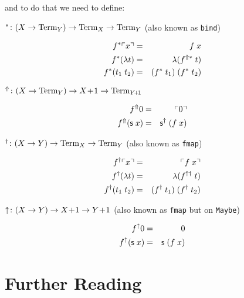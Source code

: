 and to do that we need to define:

$^* \colon (X \to \mathrm{Term}_{Y}) \to \mathrm{Term}_{X} \to \mathrm{Term}_{Y}$ (also known as \texttt{bind})

\begin{eqnarray*}
  f^*\ulcorner x \urcorner   & = & f\;x \\
  f^*(\lambda t) & = & \lambda (f^{\Uparrow*} \; t) \\
  f^*(t_1\;t_2)  & = & (f^* \; t_1) \; (f^* \; t_2)
\end{eqnarray*}

$^\Uparrow \colon (X \to \mathrm{Term}_{Y}) \to X\!+\!1 \to \mathrm{Term}_{Y\!+\!1}$

\begin{eqnarray*}
  f^\Uparrow 0 & = & \ulcorner 0 \urcorner \\
  f^\Uparrow (\mathsf{s} \; x) & = & \mathsf{s}^\dagger\;(f\;x) \\
\end{eqnarray*}

$^\dagger \colon (X \to Y) \to \mathrm{Term}_{X} \to \mathrm{Term}_{Y}$ (also known as \texttt{fmap})

\begin{eqnarray*}
  f^\dagger\ulcorner x \urcorner   & = & \ulcorner f\;x \urcorner \\
  f^\dagger(\lambda t) & = & \lambda(f^{\uparrow\dagger}\;t) \\
  f^\dagger(t_1\;t_2)  & = & (f^\dagger\;t_1)\;(f^\dagger\;t_2)
\end{eqnarray*}

$\uparrow \colon (X \to Y) \to X\!+\!1 \to Y\!+\!1$
  (also known as \texttt{fmap} but on \texttt{Maybe})

\begin{eqnarray*}
  f^\uparrow 0            & = & 0 \\
  f^\uparrow (\mathsf{s}\;x) & = & \mathsf{s}\;(f \; x)
\end{eqnarray*}

\section{Further Reading}
